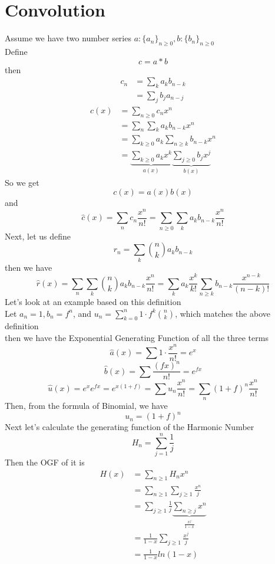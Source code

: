 \documentclass[11pt]{article}
\begin{document}
\section*{Convolution}
Assume we have two number series \(a:\{a_n\}_{n\geq 0},b:\{b_n\}_{n\geq 0}\) \\
Define
\[
c=a*b
\]
then
\begin{align*}
c_n &= \sum_{k}^{}a_kb_{n-k} \\
	&= \sum_{j}^{}b_ja_{n-j}
\end{align*}
\begin{align*}
c(x) &= \sum_{n\geq 0}c_nx^n	\\
	 &= \sum_n\sum_ka_kb_{n-k}x^n \\
	 &= \sum_{k\geq 0}a_k\sum_{n\geq k}b_{n-k}x^n \\
	 &=\underbrace{\sum_{k\geq 0}a_kx^k}_{a(x)}\underbrace{\sum_{j\geq 0}b_jx^j}_{b(x)}
\end{align*}
So we get \\
\[c(x)=a(x)b(x)\]
and 
\[
\hat{c}(x)=\sum_nc_n\frac{x^n}{n!}=\sum_{n\geq 0}\sum_ka_kb_{n-k}\frac{x^n}{n!}
\]
Next, let us define 
\[
r_n=\sum_{k}\binom{n}{k}a_kb_{n-k}
\]
then we have\\
\[
\hat{r}(x)=\sum_n\sum_k\binom{n}{k}a_kb_{n-k}\frac{x^n}{n!}=\sum_ka_k\frac{x^k}{k!}\sum_{n\geq k}b_{n-k}\frac{x^{n-k}}{(n-k)!}
\]
Let's look at an example based on this definition\\
Let \(a_n=1,b_n=f^n\), and \(u_n=\sum_{k=0}^n1\cdot f^k\binom{n}{k}\), which matches the above definition\\
then we have the Exponential Generating Function of all the three terms \\
\[
\hat{a}(x)=\sum1\cdot \frac{x^n}{n!}=e^x
\]
\[
\hat{b}(x)=\sum\frac{(fx)^n}{n!}=e^{fx}
\]
\[
\hat{u}(x)=e^xe^{fx}=e^{x(1+f)}=\sum u_n\frac{x^n}{n!}=\sum_n(1+f)^n\frac{x^n}{n!}
\]
Then, from the formula of Binomial, we have\\
\[
u_n=(1+f)^n
\]
Next let's calculate the generating function of the Harmonic Number \\
\[
H_n=\sum_{j=1}^n\frac{1}{j}
\]
Then the OGF of it is \\
\begin{align*}
H(x) &= \sum_{n\geq 1}H_nx^n	\\
	 &= \sum_{n\geq 1}\sum_{j\geq 1}\frac{x^n}{j} \\
	 &= \sum_{j\geq 1}\frac{1}{j}\underbrace{\sum_{n\geq j}x^n}_{\frac{x^j}{1-x}} \\
	 &= \frac{1}{1-x}\sum_{j\geq 1}\frac{x^j}{j} \\
	 &= \frac{1}{1-x}ln(1-x)
\end{align*}
\end{document}
